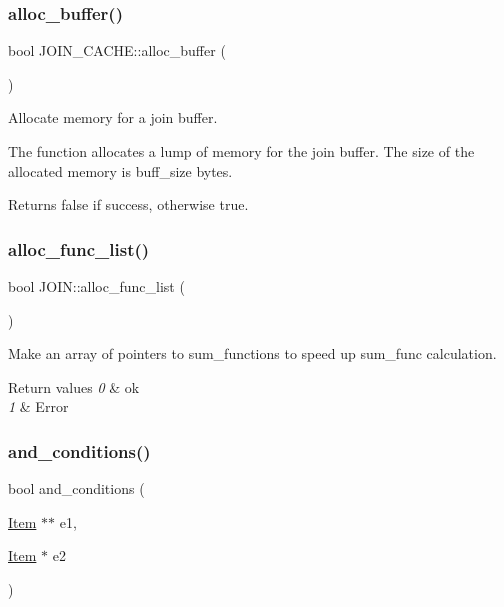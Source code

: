 \subsubsection{\texorpdfstring{alloc\+\_\+buffer()}{alloc\_buffer()}}
{\footnotesize\ttfamily bool J\+O\+I\+N\+\_\+\+C\+A\+C\+H\+E\+::alloc\+\_\+buffer (\begin{DoxyParamCaption}{ }\end{DoxyParamCaption})\hspace{0.3cm}{\ttfamily [protected]}}

Allocate memory for a join buffer.

The function allocates a lump of memory for the join buffer. The size of the allocated memory is \textquotesingle{}buff\+\_\+size\textquotesingle{} bytes.

\begin{DoxyReturn}{Returns}
false if success, otherwise true. 
\end{DoxyReturn}
\mbox{\label{group__Query__Optimizer_ga140c4ff912190f1c0f6279897103a720}} 
\subsubsection{\texorpdfstring{alloc\+\_\+func\+\_\+list()}{alloc\_func\_list()}}
{\footnotesize\ttfamily bool J\+O\+I\+N\+::alloc\+\_\+func\+\_\+list (\begin{DoxyParamCaption}{ }\end{DoxyParamCaption})}

Make an array of pointers to sum\+\_\+functions to speed up sum\+\_\+func calculation.


\begin{DoxyRetVals}{Return values}
{\em 0} & ok \\
\hline
{\em 1} & Error \\
\hline
\end{DoxyRetVals}
\mbox{\label{group__Query__Optimizer_gad3c0a5624f789fb0bf0c5fc5ec057de9}} 
\subsubsection{\texorpdfstring{and\+\_\+conditions()}{and\_conditions()}}
{\footnotesize\ttfamily bool and\+\_\+conditions (\begin{DoxyParamCaption}\item[{\mbox{\hyperlink{classItem}{Item}} $\ast$$\ast$}]{e1,  }\item[{\mbox{\hyperlink{classItem}{Item}} $\ast$}]{e2 }\end{DoxyParamCaption})}

